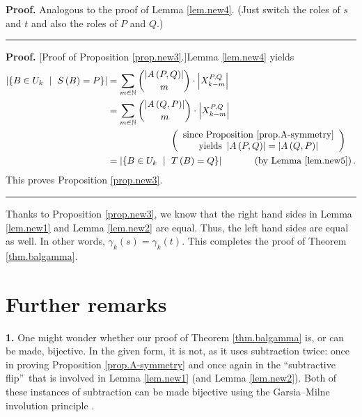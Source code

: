 \documentclass[numbers=enddot,12pt,final,onecolumn,notitlepage]{scrartcl}%
\theoremstyle{definition}
\newenvironment{proof}[1][Proof]{\noindent\textbf{#1.} }{\ \rule{0.5em}{0.5em}}
\let\sumnonlimits\sum
\renewcommand{\sum}{\sumnonlimits\limits}
\theoremstyle{plainsl}
\begin{document}
\begin{proof}
Analogous to the proof of Lemma \ref{lem.new4}. (Just switch the roles of $s$
and $t$ and also the roles of $P$ and $Q$.)
\end{proof}

\begin{proof}
[Proof of Proposition \ref{prop.new3}.]Lemma \ref{lem.new4} yields%
\begin{align*}
\left\vert \left\{  B\in U_{k}\ \mid\ S\left(  B\right)  =P\right\}
\right\vert  &  =\sum_{m\in\mathbb{N}}\dbinom{\left\vert A\left(  P,Q\right)
\right\vert }{m}\cdot\left\vert X_{k-m}^{P,Q}\right\vert \\
&  =\sum_{m\in\mathbb{N}}\dbinom{\left\vert A\left(  Q,P\right)  \right\vert
}{m}\cdot\left\vert X_{k-m}^{P,Q}\right\vert \\
&  \ \ \ \ \ \ \ \ \ \ \ \ \ \ \ \ \ \ \ \ \left(
\begin{array}
[c]{c}%
\text{since Proposition \ref{prop.A-symmetry}}\\
\text{yields }\left\vert A\left(  P,Q\right)  \right\vert =\left\vert A\left(
Q,P\right)  \right\vert
\end{array}
\right) \\
&  =\left\vert \left\{  B\in U_{k}\ \mid\ T\left(  B\right)  =Q\right\}
\right\vert \ \ \ \ \ \ \ \ \ \ \left(  \text{by Lemma \ref{lem.new5}}\right)
.
\end{align*}
This proves Proposition \ref{prop.new3}.
\end{proof}

Thanks to Proposition \ref{prop.new3}, we know that the right hand sides in
Lemma \ref{lem.new1} and Lemma \ref{lem.new2} are equal. Thus, the left hand
sides are equal as well. In other words, $\gamma_{k}\left(  s\right)
=\gamma_{k}\left(  t\right)  $. This completes the proof of Theorem
\ref{thm.balgamma}.

\section{Further remarks}

\hspace{\parindent} \textbf{1.} One might wonder whether our proof of Theorem
\ref{thm.balgamma} is, or can be made, bijective. In the given form, it is
not, as it uses subtraction twice: once in proving Proposition
\ref{prop.A-symmetry} and once again in the \textquotedblleft subtractive
flip\textquotedblright\ that is involved in Lemma \ref{lem.new1} (and Lemma
\ref{lem.new2}). Both of these instances of subtraction can be made bijective
using the Garsia--Milne involution principle \cite[\S 4.6]{StaWhi86}.
\end{document}
